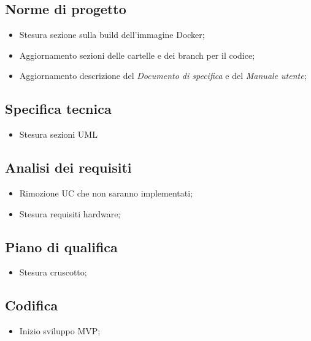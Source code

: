 \subsection{Norme di progetto}
\begin{itemize}
    \item Stesura sezione sulla build dell'immagine Docker;
    \item Aggiornamento sezioni delle cartelle e dei branch per il codice;
    \item Aggiornamento descrizione del \textit{Documento di specifica} e del \textit{Manuale utente};
\end{itemize}

\subsection{Specifica tecnica}
\begin{itemize}
    \item Stesura sezioni UML
\end{itemize}

\subsection{Analisi dei requisiti}
\begin{itemize}
    \item Rimozione UC che non saranno implementati;
    \item Stesura requisiti hardware;
\end{itemize}

\subsection{Piano di qualifica}
\begin{itemize}
    \item Stesura cruscotto;
\end{itemize}

\subsection{Codifica}
\begin{itemize}
    \item Inizio sviluppo MVP;
\end{itemize}

